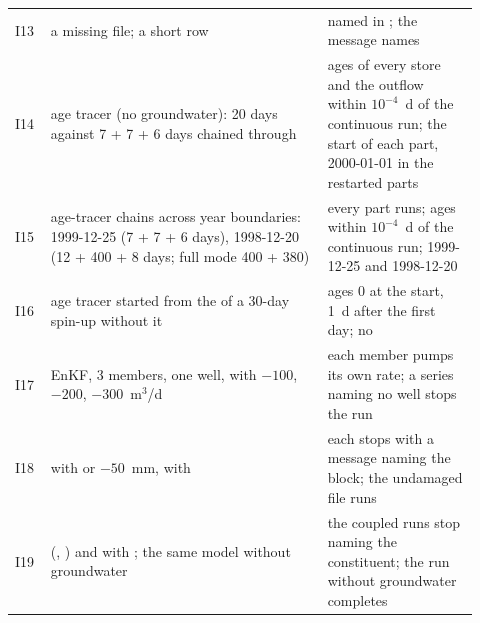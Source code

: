 \begin{longtable}{P{0.07\linewidth}P{0.55\linewidth}P{0.30\linewidth}}
I13 & a missing  file; a short  row & named in ; the message names \\
I14 & age tracer (no groundwater): 20 days against 7 + 7 + 6 days chained through  & ages of every store and the outflow within $10^{-4}$~d of the continuous run;  the start of each part,  2000-01-01 in the restarted parts\\
I15 & age-tracer chains across year boundaries: 1999-12-25 (7 + 7 + 6 days), 1998-12-20 (12 + 400 + 8 days; full mode 400 + 380) & every part runs; ages within $10^{-4}$~d of the continuous run;  1999-12-25 and 1998-12-20\\
I16 & age tracer started from the  of a 30-day spin-up without it & ages 0 at the start, 1~d after the first day; no \\
I17 & EnKF, 3 members, one well,  with $-100$, $-200$, $-300$~m$^3$/d & each member pumps its own rate; a series naming no well stops the run\\
I18 &  with  or $-50$~mm,  with  & each stops with a message naming the block; the undamaged file runs\\
I19 &  (, ) and  with ; the same model without groundwater & the coupled runs stop naming the constituent; the run without groundwater completes\\\bottomrule
\end{longtable}

